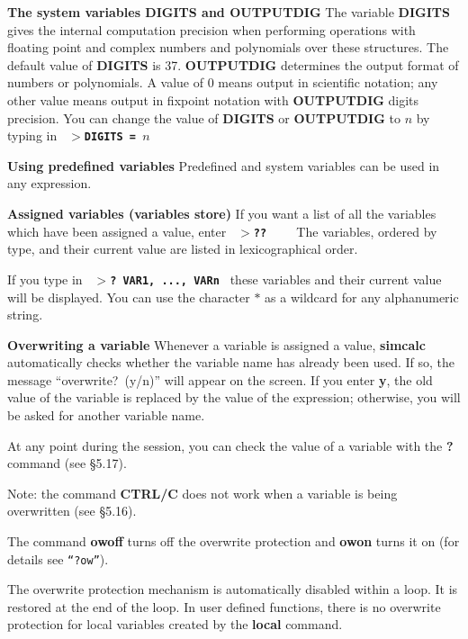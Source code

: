 \leer\leer
{\bf The system variables DIGITS and OUTPUTDIG}
\leer
The variable {\bf DIGITS} gives the internal computation precision when performing
operations with floating point and complex numbers and polynomials over these
structures. The default value of {\bf DIGITS} is 37. {\bf OUTPUTDIG} determines
the output format of numbers or polynomials. A value of 0 means output in 
scientific notation; any other value means output in fixpoint notation with 
{\bf OUTPUTDIG} digits precision. You can change the value of {\bf DIGITS} or 
{\bf OUTPUTDIG} to $n$ by typing in
\leer
{\tt
  {\bf $>$DIGITS = $n$} \care {}  \care
}

\leer\leer
{\bf Using predefined variables}
\leer
Predefined and system variables can be used in any expression.

\leer\leer
{\bf Assigned variables (variables store)}
\leer
If you want a list of all the variables which have been assigned a value,
enter
\leer
{\tt
  {\bf  $>$?? }\ \ \care
}
\leer
The variables, ordered by type, and their current value are listed in lexicographical
order.

\newpage

If you type in
\leer
{\tt
  {\bf $>$? VAR1, ..., VARn} \care
}
\leer
these variables and their current value will be displayed. You can use the character $*$
as a wildcard for any alphanumeric string.

\leer\leer
{\bf Overwriting a variable}
\leer
Whenever a variable is assigned a value, {\bf simcalc} automatically checks whether
the variable name has already been used. If so, the message ``overwrite?\ (y/n)'' will
appear on the screen. If you enter {\bf y}, the old value of the variable is replaced
by the value of the expression; otherwise, you will be asked for another variable name.

At any point during the session, you can check the value of a variable with the {\bf ?}
command (see \S 5.17).

Note: the command {\bf CTRL/C} does not work when a variable is being
overwritten (see \S 5.16).

The command {\bf owoff} turns off the overwrite protection and {\bf owon} turns it on
(for details see {\tt ``?ow''}).

The overwrite protection mechanism is automatically disabled within a loop. It is restored
at the end of the loop. In user defined functions, there is no overwrite protection
for local variables created by the {\bf local} command.

